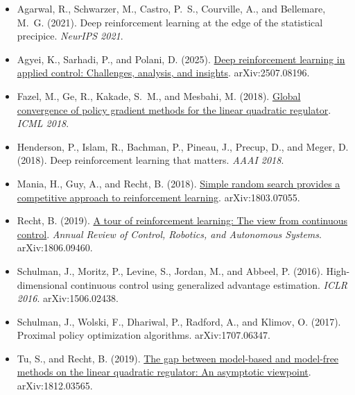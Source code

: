 \documentclass[11pt]{article}
\begin{document}
\begin{itemize}[leftmargin=*]
  \item Agarwal, R., Schwarzer, M., Castro, P.~S., Courville, A., and Bellemare, M.~G. (2021). Deep
    reinforcement learning at the edge of the statistical precipice. \emph{NeurIPS 2021}.
  \item Agyei, K., Sarhadi, P., and Polani, D. (2025).
    \href{https://arxiv.org/html/2507.08196}{Deep reinforcement learning in applied control:
    Challenges, analysis, and insights}. arXiv:2507.08196.
  \item Fazel, M., Ge, R., Kakade, S.~M., and Mesbahi, M. (2018).
    \href{https://proceedings.mlr.press/v80/fazel18a.html}{Global convergence of policy gradient
    methods for the linear quadratic regulator}. \emph{ICML 2018}.
  \item Henderson, P., Islam, R., Bachman, P., Pineau, J., Precup, D., and Meger, D. (2018). Deep
    reinforcement learning that matters. \emph{AAAI 2018}.
  \item Mania, H., Guy, A., and Recht, B. (2018).
    \href{https://arxiv.org/pdf/1803.07055}{Simple random search provides a competitive approach to
    reinforcement learning}. arXiv:1803.07055.
  \item Recht, B. (2019). \href{https://arxiv.org/pdf/1806.09460}{A tour of reinforcement learning:
    The view from continuous control}. \emph{Annual Review of Control, Robotics, and Autonomous
    Systems}. arXiv:1806.09460.
  \item Schulman, J., Moritz, P., Levine, S., Jordan, M., and Abbeel, P. (2016). High-dimensional
    continuous control using generalized advantage estimation. \emph{ICLR 2016}. arXiv:1506.02438.
  \item Schulman, J., Wolski, F., Dhariwal, P., Radford, A., and Klimov, O. (2017). Proximal policy
    optimization algorithms. arXiv:1707.06347.
  \item Tu, S., and Recht, B. (2019). \href{https://arxiv.org/pdf/1812.03565}{The gap between
    model-based and model-free methods on the linear quadratic regulator: An asymptotic viewpoint}.
    arXiv:1812.03565.
\end{itemize}
\end{document}
